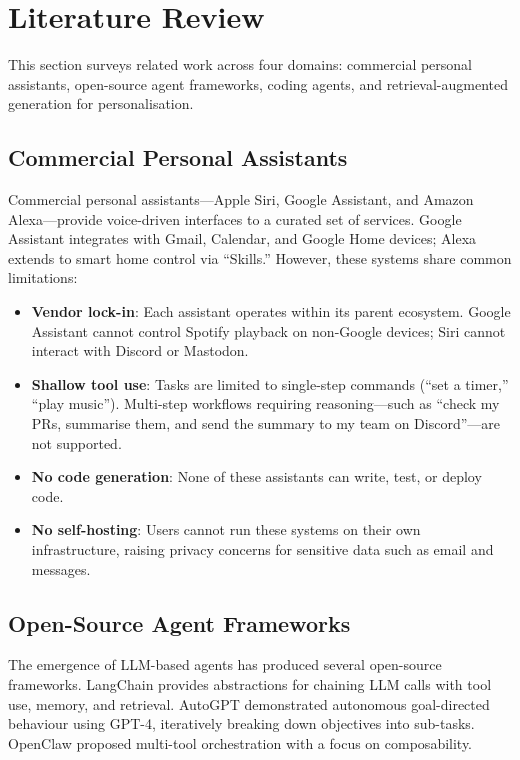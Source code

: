 \section{Literature Review}
\label{sec:literature}

This section surveys related work across four domains: commercial personal assistants, open-source agent frameworks, coding agents, and retrieval-augmented generation for personalisation.

\subsection{Commercial Personal Assistants}

Commercial personal assistants---Apple Siri, Google Assistant, and Amazon Alexa---provide voice-driven interfaces to a curated set of services. Google Assistant integrates with Gmail, Calendar, and Google Home devices; Alexa extends to smart home control via ``Skills.'' However, these systems share common limitations:

\begin{itemize}[leftmargin=*]
  \item \textbf{Vendor lock-in}: Each assistant operates within its parent ecosystem. Google Assistant cannot control Spotify playback on non-Google devices; Siri cannot interact with Discord or Mastodon.
  \item \textbf{Shallow tool use}: Tasks are limited to single-step commands (``set a timer,'' ``play music''). Multi-step workflows requiring reasoning---such as ``check my PRs, summarise them, and send the summary to my team on Discord''---are not supported.
  \item \textbf{No code generation}: None of these assistants can write, test, or deploy code.
  \item \textbf{No self-hosting}: Users cannot run these systems on their own infrastructure, raising privacy concerns for sensitive data such as email and messages.
\end{itemize}

\subsection{Open-Source Agent Frameworks}

The emergence of LLM-based agents has produced several open-source frameworks. LangChain \cite{chase2022langchain} provides abstractions for chaining LLM calls with tool use, memory, and retrieval. AutoGPT \cite{significantgravitas2023autogpt} demonstrated autonomous goal-directed behaviour using GPT-4, iteratively breaking down objectives into sub-tasks. OpenClaw proposed multi-tool orchestration with a focus on composability.

